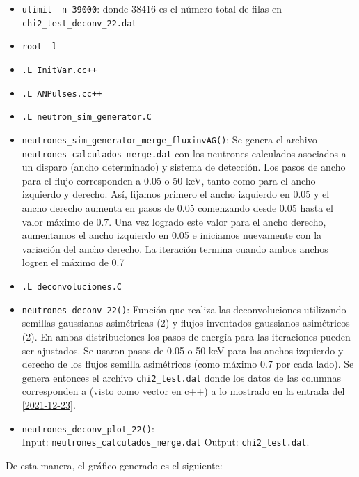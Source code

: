 \documentclass[11pt,letterpaper]{article}
\begin{document}
\begin{itemize}
\item \verb|ulimit -n 39000|: donde 38416 es el número total de filas en \verb|chi2_test_deconv_22.dat|
\item \verb|root -l|
\item \verb|.L InitVar.cc++|
\item \verb|.L ANPulses.cc++|
\item \verb|.L neutron_sim_generator.C|
\item \verb|neutrones_sim_generator_merge_fluxinvAG()|: Se genera el archivo \verb|neutrones_calculados_merge.dat| con los neutrones calculados asociados a un disparo (ancho determinado) y sistema de detección. Los pasos de ancho para el flujo corresponden a 0.05 o 50 keV, tanto como para el ancho izquierdo y derecho. Así, fijamos primero el ancho izquierdo en 0.05 y el ancho derecho aumenta en pasos de 0.05 comenzando desde 0.05 hasta el valor máximo de 0.7. Una vez logrado este valor para el ancho derecho, aumentamos el ancho izquierdo en 0.05 e iniciamos nuevamente con la variación del ancho derecho. La iteración termina cuando ambos anchos logren el máximo de 0.7 
\item \verb|.L deconvoluciones.C|
\item \verb|neutrones_deconv_22()|: 
Función que realiza las deconvoluciones utilizando semillas gaussianas asimétricas (2) y flujos inventados gaussianos asimétricos (2). En ambas distribuciones los pasos de energía para las iteraciones pueden ser ajustados. Se usaron pasos de 0.05 o 50 keV para las anchos izquierdo y derecho de los flujos semilla asimétricos (como máximo 0.7 por cada lado). Se genera entonces el archivo \verb|chi2_test.dat| donde los datos de las columnas corresponden a (visto como vector en c++) a lo mostrado en la entrada del \ref{2021-12-23}.

\item \verb|neutrones_deconv_plot_22()|:\\
Input: \verb|neutrones_calculados_merge.dat| Output:  \verb|chi2_test.dat|.
\end{itemize}

De esta manera, el gráfico generado es el siguiente:
\end{document}
